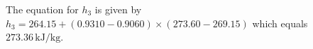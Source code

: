The equation for \( h_{3} \) is given by \( h_{3} = 264.15 + (0.9310 - 0.9060) \times (273.60 - 269.15) \) which equals \( 273.36 \, \text{kJ/kg} \).